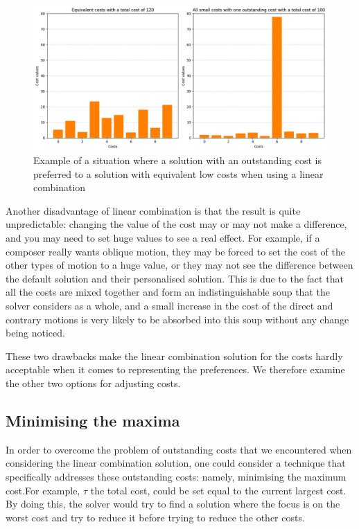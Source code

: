 \begin{figure}[h]
    \centering
    \includegraphics[width=1\textwidth]{Images/outstanding-costs.png}
    \caption{Example of a situation where a solution with an outstanding cost is preferred to a solution with equivalent low costs when using a linear combination}
    \label{fig:outstanding-cost}
\end{figure}

Another disadvantage of linear combination is that the result is quite unpredictable: changing the value of the cost may or may not make a difference, and you may need to set huge values to see a real effect. For example, if a composer really wants oblique motion, they may be forced to set the cost of the other types of motion to a huge value, or they may not see the difference between the default solution and their personalised solution. This is due to the fact that all the costs are mixed together and form an indistinguishable soup that the solver considers as a whole, and a small increase in the cost of the direct and contrary motions is very likely to be absorbed into this soup without any change being noticed.

These two drawbacks make the linear combination solution for the costs hardly acceptable when it comes to representing the preferences.
We therefore examine the other two options for adjusting costs.

\subsection {Minimising the maxima} \label{section:minimising-the-maxima}
In order to overcome the problem of outstanding costs that we encountered when considering the linear combination solution, one could consider a technique that specifically addresses these outstanding costs: namely, minimising the maximum cost.For example, $\tau$ the total cost, could be set equal to the current largest cost. By doing this, the solver would try to find a solution where the focus is on the worst cost and try to reduce it before trying to reduce the other costs.

